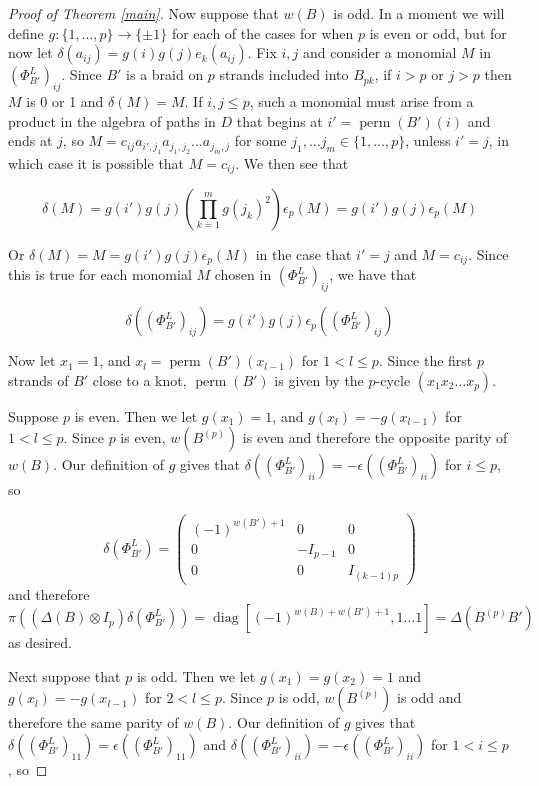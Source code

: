 \documentclass[11pt]{amsart}
\def\ltblue{blue!20!white}
\newcommand\diag{\operatorname{diag}}
\newcommand\perm{\operatorname{perm}}
\begin{document}
\begin{proof}[Proof of Theorem \ref{main}]
Now suppose that $w(B)$ is odd.  In a moment we will define $g\colon \{1,\ldots,p\}\rightarrow \{\pm 1\}$ for each of the cases for when $p$ is even or odd, but for now let $\delta(a_{ij}) = g(i)g(j)e_k(a_{ij})$.  Fix $i,j$ and consider a monomial $M$ in $\left(\Phi_{B'}^L\right)_{ij}$.  Since $B'$ is a braid on $p$ strands included into $B_{pk}$, if $i>p$ or $j>p$ then $M$ is 0 or 1 and $\delta(M) = M$.  If $i,j\le p$, such a monomial must arise from a product in the algebra of paths in $D$ \todo[color=\ltblue]{just introducing this notation} that begins at $i' = \perm(B')(i)$ and ends at $j$, so $M=c_{ij}a_{i',j_1}a_{j_1,j_2}\ldots a_{j_m,j}$ for some $j_1,\ldots j_m\in \{1,\ldots,p\}$, unless $i' = j$, in which case it is possible that $M=c_{ij}$.  We then see that 

$$\delta(M) = g(i')g(j)\left(\prod_{k=1}^m g(j_k)^2\right)\epsilon_p(M) = g(i')g(j)\epsilon_p(M)$$

\noindent Or $\delta(M) = M = g(i')g(j)\epsilon_p(M)$ in the case that $i'=j$ and $M=c_{ij}$.  Since this is true for each monomial $M$ chosen in $\left(\Phi_{B'}^L\right)_{ij}$, we have that

$$\delta\left(\left(\Phi_{B'}^L\right)_{ij}\right) = g(i')g(j)\epsilon_p\left(\left(\Phi_{B'}^L\right)_{ij}\right)$$

Now let $x_1 = 1$, and $x_l = \perm(B')(x_{l-1})$ for $1<l\le p$.  Since the first $p$ strands of $B'$ close to a knot, $\perm(B')$ is given by the $p$-cycle $(x_1x_2\ldots x_p)$.

Suppose $p$ is even.  Then we let $g(x_1) = 1$, and $g(x_l) = -g(x_{l-1})$ for $1<l\le p$.  Since $p$ is even, $w(B^{(p)})$ is even and therefore the opposite parity of $w(B)$.  Our definition of $g$ gives that $\delta\left(\left(\Phi_{B'}^L\right)_{ii}\right) = -\epsilon\left(\left(\Phi_{B'}^L\right)_{ii}\right)$ for $i\le p$, so 

$$\delta\left(\Phi_{B'}^L\right) = 
\left( \begin{array}{ccc}
(-1)^{w(B')+1} & 0 & 0 \\
0 & -I_{p-1} & 0 \\
0 & 0 & I_{(k-1)p} \end{array} \right)
$$
\noindent and therefore
$$
\pi\left(\left(\Delta(B)\otimes I_p\right)\delta\left(\Phi_{B'}^L\right)\right) = \diag[(-1)^{w(B) + w(B') + 1},1\ldots 1] = \Delta(B^{(p)}B')
$$
\noindent as desired.

Next suppose that $p$ is odd.  Then we let $g(x_1) = g(x_2) = 1$ and $g(x_l) = -g(x_{l-1})$ for $2<l\le p$.  Since $p$ is odd, $w(B^{(p)})$ is odd and therefore the same parity of $w(B)$.  Our definition of $g$ gives that $\delta\left(\left(\Phi_{B'}^L\right)_{11}\right) = \epsilon\left(\left(\Phi_{B'}^L\right)_{11}\right)$ and $\delta\left(\left(\Phi_{B'}^L\right)_{ii}\right) = -\epsilon\left(\left(\Phi_{B'}^L\right)_{ii}\right)$ for $1<i\le p$, so 


\end{proof}
\end{document}
